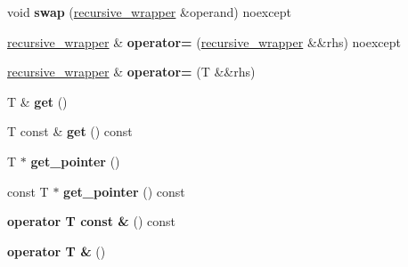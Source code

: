 \begin{DoxyCompactItemize}
\item 
\mbox{\label{classrev_1_1recursive__wrapper_af4baff59b8bd81c44ca2906b58419031}} 
void {\bfseries swap} (\mbox{\hyperlink{classrev_1_1recursive__wrapper}{recursive\+\_\+wrapper}} \&operand) noexcept
\item 
\mbox{\label{classrev_1_1recursive__wrapper_ac778a9987a507d64537e77af0582c9ed}} 
\mbox{\hyperlink{classrev_1_1recursive__wrapper}{recursive\+\_\+wrapper}} \& {\bfseries operator=} (\mbox{\hyperlink{classrev_1_1recursive__wrapper}{recursive\+\_\+wrapper}} \&\&rhs) noexcept
\item 
\mbox{\label{classrev_1_1recursive__wrapper_ae88401a27db2eb05cc6470246c51ca71}} 
\mbox{\hyperlink{classrev_1_1recursive__wrapper}{recursive\+\_\+wrapper}} \& {\bfseries operator=} (T \&\&rhs)
\item 
\mbox{\label{classrev_1_1recursive__wrapper_a3fc30e1f5c71db926cdbb702b491ae58}} 
T \& {\bfseries get} ()
\item 
\mbox{\label{classrev_1_1recursive__wrapper_a79eb7f6d7d3975042adf144262219c31}} 
T const  \& {\bfseries get} () const
\item 
\mbox{\label{classrev_1_1recursive__wrapper_a875e75ee80a263bf4f3d65cc7c57ecab}} 
T $\ast$ {\bfseries get\+\_\+pointer} ()
\item 
\mbox{\label{classrev_1_1recursive__wrapper_af3bb2c0bdf3369137e860dd9f39313f6}} 
const T $\ast$ {\bfseries get\+\_\+pointer} () const
\item 
\mbox{\label{classrev_1_1recursive__wrapper_a4622ad9132d554de82e11e16c7806e43}} 
{\bfseries operator T const \&} () const
\item 
\mbox{\label{classrev_1_1recursive__wrapper_abc8ecaa27d83b3d44a50d4c300263c17}} 
{\bfseries operator T \&} ()
\end{DoxyCompactItemize}


